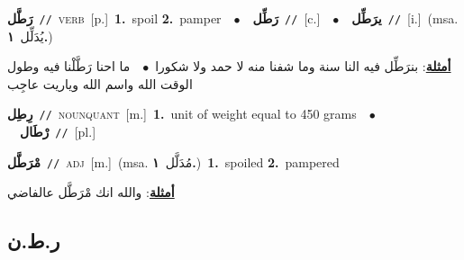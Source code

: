 \documentclass[10pt,a4paper,twoside]{article} %
\begin{document}
\begin{multicols}{2}
{\setlength\topsep{0pt}\textbf{\foreignlanguage{arabic}{رَطَّل}}\ {\color{gray}\texttt{//}\color{black}}\ \textsc{verb}\ [p.]\ \textbf{1.}~spoil  \textbf{2.}~pamper\ \ $\bullet$\ \ \setlength\topsep{0pt}\textbf{\foreignlanguage{arabic}{رَطِّل}}\ {\color{gray}\texttt{//}\color{black}}\ [c.]\ \ $\bullet$\ \ \setlength\topsep{0pt}\textbf{\foreignlanguage{arabic}{يرَطِّل}}\ {\color{gray}\texttt{//}\color{black}}\ [i.]\ \color{gray}(msa. \foreignlanguage{arabic}{يُدَلِّل}~\foreignlanguage{arabic}{\textbf{١.}})\color{black}\  \begin{flushright}\color{gray}\foreignlanguage{arabic}{\textbf{\underline{\foreignlanguage{arabic}{أمثلة}}}: بنرَطِّل فيه النا سنة وما شفنا منه لا حمد ولا شكورا\ $\bullet$\ \  ما احنا رَطَّلْنا فيه وطول الوقت الله واسم الله وياريت عاجِب}\end{flushright}\color{black}} \vspace{2mm}

{\setlength\topsep{0pt}\textbf{\foreignlanguage{arabic}{رِطِل}}\ {\color{gray}\texttt{//}\color{black}}\ \textsc{noun\textunderscore quant}\ [m.]\ \textbf{1.}~unit of weight equal to 450 grams\ \ $\bullet$\ \ \setlength\topsep{0pt}\textbf{\foreignlanguage{arabic}{رْطَال}}\ {\color{gray}\texttt{//}\color{black}}\ [pl.]\ } \vspace{2mm}

{\setlength\topsep{0pt}\textbf{\foreignlanguage{arabic}{مْرَطَّل}}\ {\color{gray}\texttt{//}\color{black}}\ \textsc{adj}\ [m.]\ \color{gray}(msa. \foreignlanguage{arabic}{مُدَلَّل}~\foreignlanguage{arabic}{\textbf{١.}})\color{black}\ \textbf{1.}~spoiled  \textbf{2.}~pampered\  \begin{flushright}\color{gray}\foreignlanguage{arabic}{\textbf{\underline{\foreignlanguage{arabic}{أمثلة}}}: والله انك مْرَطَّل عالفاضي}\end{flushright}\color{black}} \vspace{2mm}

\vspace{-3mm}
\subsection*{\color{blue}\foreignlanguage{arabic}{ر.ط.ن}\color{blue}{}} 


\end{multicols}
\end{document}
